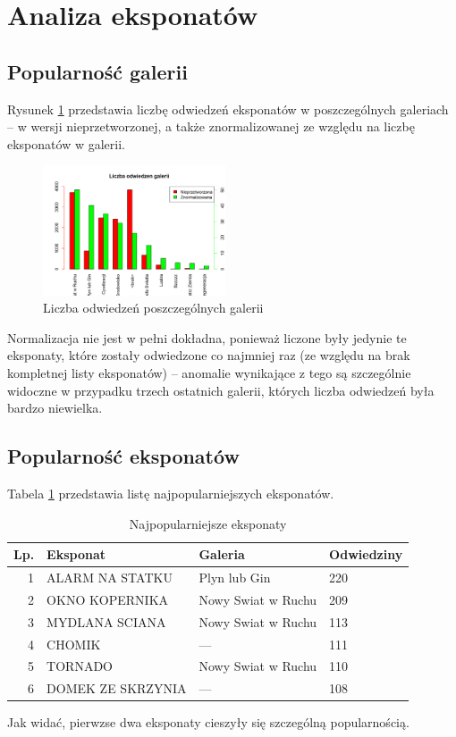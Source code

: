 \documentclass[conference]{IEEEtran}
\begin{document}
\section{Analiza eksponatów}
\subsection{Popularność galerii}
Rysunek \ref{galerie} przedstawia liczbę odwiedzeń eksponatów w poszczególnych galeriach -- w wersji nieprzetworzonej, a także znormalizowanej ze względu na liczbę eksponatów w galerii.
\begin{figure}[H]
\includegraphics[width=0.48\textwidth]{galerie.png}
\caption{Liczba odwiedzeń poszczególnych galerii}
\label{galerie}
\end{figure}
Normalizacja nie jest w pełni dokładna, ponieważ liczone były jedynie te eksponaty, które zostały odwiedzone co najmniej raz (ze względu na brak kompletnej listy eksponatów) -- anomalie wynikające z tego są szczególnie widoczne w przypadku trzech ostatnich galerii, których liczba odwiedzeń była bardzo niewielka.
\subsection{Popularność eksponatów}
Tabela \ref{top_eksponaty} przedstawia listę najpopularniejszych eksponatów.
\begin{table}[H]
\caption{Najpopularniejsze eksponaty}
\label{top_eksponaty}
\centering
\begin{tabular}{|r|l|l|l|}
\hline
\textbf{Lp.} & \textbf{Eksponat} & \textbf{Galeria} & \textbf{Odwiedziny} \\
\hline
 1 &   ALARM NA STATKU  &     Plyn lub Gin     &         220 \\
 2 &   OKNO KOPERNIKA & Nowy Swiat w Ruchu    &          209 \\
 3 &   MYDLANA SCIANA & Nowy Swiat w Ruchu   &           113 \\
 4 &           CHOMIK  &           ---    &          111 \\
 5 &          TORNADO & Nowy Swiat w Ruchu    &          110 \\
 6 & DOMEK ZE SKRZYNIA  &           ---   &          108 \\
\hline
\end{tabular}
\end{table}
Jak widać, pierwzse dwa eksponaty cieszyły się szczególną popularnością.
\end{document}
